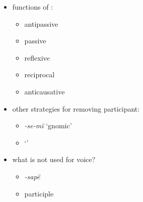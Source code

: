 \documentclass{memoir}
\begin{document}
\begin{itemize}
\tightlist
\item
  functions of :

  \begin{itemize}
  \tightlist
  \item
    antipassive
  \item
    passive
  \item
    reflexive
  \item
    reciprocal
  \item
    anticausative
  \end{itemize}
\item
  other strategies for removing participant:

  \begin{itemize}
  \tightlist
  \item
    \emph{-se-mï} `gnomic'
  \item
     `'
  \end{itemize}
\item
  what is not used for voice?

  \begin{itemize}
  \tightlist
  \item
    \emph{-sapë}
  \item
    participle
  \end{itemize}
\end{itemize}

\printbibliography
\end{document}
